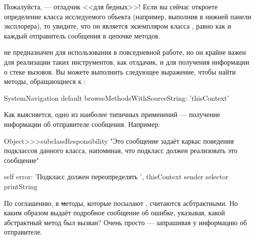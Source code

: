 \documentclass[a4paper,10pt,twoside]{book}
\begin{document}
Пожалуйста, --- отладчик <<для бедных>>!
Если вы сейчас откроете определение класса исследуемого объекта (например, выполнив  в нижней панели эксплорера), то увидите, что он является экземпляром класса , равно как и каждый отправитель сообщения в цепочке методов.

 не предназначен для использования в повседневной работе, но он крайне важен для реализации таких инструментов, как отлдачик, и для получения информации о стеке вызовов.
Вы можете выполнить следующее выражение, чтобы найти методы, обращающиеся к :

\begin{code}{}
SystemNavigation default browseMethodsWithSourceString: 'thisContext'
\end{code}

Как выясняется, одно из наиболее типичных применений  --- получение информации об отправителе сообщения.
Например:
\begin{code}{}
Object>>>subclassResponsibility
	"Это сообщение задаёт каркас поведения подклассов данного класса, 
	напоминая, что подкласс должен реализовать это сообщение"

	self error: 'Подкласс должен переопределять ', thisContext sender selector printString
\end{code}

По соглашению, в \st методы, которые посылают , считаются асбтрактными. Но каким образом  выдаёт подробное сообщение об ошибке, указывая, какой абстрактный метод был вызван? Очень просто --- запрашивая у  информацию об отправителе.
\end{document}
